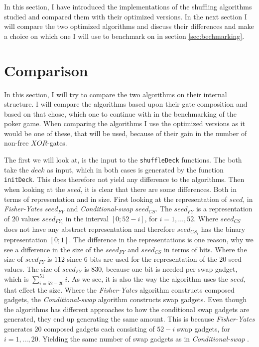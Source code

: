 \documentclass[twoside,11pt,openright]{report}
\newcommand{\FY}{\textit{Fisher-Yates} }
\newcommand{\CS}{\textit{Conditional-swap} }
\begin{document}
\bigskip

In this section, I have introduced the implementations of the shuffling algorithms studied and compared them with their optimized versions. In the next section I will compare the two optimized algorithms and discuss their differences and make a choice on which one I will use to benchmark on in section \ref{sec:bechmarking}.

\section{Comparison}
\label{sec:comp}

In this section, I will try to compare the two algorithms on their internal structure. I will compare the algorithms based upon their gate composition and based on that chose, which one to continue with in the benchmarking of the poker game. When comparing the algorithms I use the optimized versions as it would be one of these, that will be used, because of their gain in the number of non-free $XOR$-gates.

\bigskip

The first we will look at, is the input to the \verb|shuffleDeck| functions. The both take the $deck$ as input, which in both cases is generated by the function \verb|initDeck|. This does therefore not yield any difference to the algorithms. Then when looking at the $seed$, it is clear that there are some differences. Both in terms of representation and in size. First looking at the representation of $seed$, in \FY $seed_{FY}$ and \CS $seed_{CS}$. The $seed_{FY}$ is a representation of $20$ values $seed_{FY_i}$ in the interval $[0;52-i]$, for $i=1,\dots, 52$. Where $seed_{CS}$ does not have any abstract representation and therefore $seed_{CS_i}$ has the binary representation $[0;1]$. The difference in the representations is one reason, why we see a difference in the size of the $seed_{FY}$ and $seed_{CS}$ in terms of bits. Where the size of $seed_{FY}$ is $112$ since $6$ bits are used for the representation of the $20$ seed values. The size of $seed_{FY}$ is $830$, because one bit is needed per swap gadget, which is $\sum_{i=52-20}^{51} i$. As we see, it is also the way the algorithm uses the $seed$, that effect the size. Where the \FY algorithm constructs composed gadgets, the \CS algorithm constructs swap gadgets. Even though the algorithms has different approaches to how the conditional swap gadgets are generated, they end up generating the same amount. This is because \FY generates $20$ composed gadgets each consisting of $52-i$ swap gadgets, for $i=1,\dots,20$. Yielding the same number of swap gadgets as in \CS.
\end{document}
